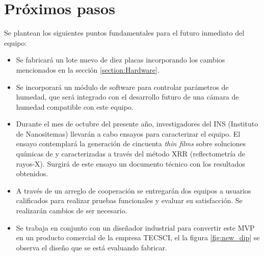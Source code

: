 \section{Próximos pasos}

Se plantean los siguientes puntos fundamentales para el futuro inmediato del equipo:  

\begin{itemize}

\item Se fabricará un lote nuevo de diez placas incorporando los cambios mencionados en la sección \ref{section:Hardware}. 

\item Se incorporará un módulo de software para controlar parámetros de humedad, que será integrado con el desarrollo futuro de una cámara de humedad compatible con este equipo.

\item Durante el mes de octubre del presente año, investigadores del INS (Instituto de Nanositemas) llevarán a cabo ensayos para caracterizar el equipo. El ensayo contemplará la generación de cincuenta \textit{thin films} sobre soluciones químicas de  y  caracterizadas a través del método XRR (reflectometría de rayos-X). Surgirá de este ensayo un documento técnico con los resultados obtenidos.  
 
\item A través de un arreglo de cooperación se entregarán dos equipos a usuarios calificados para realizar pruebas funcionales y evaluar su satisfacción. Se realizarán cambios de ser necesario.


\item Se trabaja en conjunto con un diseñador industrial para convertir este MVP en un producto comercial de la empresa TECSCI, el la figura \ref{fig:new_dip} se observa el diseño que se está evaluando fabricar.



\end{itemize}
